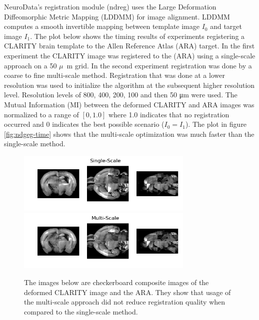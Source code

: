 \documentclass[simplex.tex]{subfiles}
\begin{document}
NeuroData’s registration module (ndreg) uses the Large Deformation
Diffeomorphic Metric Mapping (LDDMM) for image alignment.  LDDMM
computes a smooth invertible mapping between template image $I_0$ and
target image $I_1$. The plot below shows the timing results of experiments
registering a CLARITY brain template to the Allen Reference Atlas (ARA)
target.  In the first experiment the CLARITY image was registered to the
(ARA) using a single-scale approach on a 50 $\mu$~m grid.  In the second
experiment registration was done by a coarse to fine multi-scale method.
Registration that was done at a lower resolution was used to initialize
the algorithm at the subsequent higher resolution level.  Resolution
levels of 800, 400, 200, 100 and then 50 μm were used. The Mutual
Information (MI) between the deformed CLARITY and ARA images was
normalized to a range of $[0, 1.0]$ where 1.0 indicates that no
registration occurred and 0 indicates the best possible scenario ($I_0 =
I_1$).  The plot in figure \ref{fig:ndgeg-time} shows that the multi-scale optimization was much faster
than the single-scale method.


\begin{figure}[h!]
\begin{cframed}
\centering
\includegraphics[width=0.75\textwidth]{./figs/ndreg-single.png}
\includegraphics[width=0.75\textwidth]{./figs/ndreg-multiscale.png}
\label{fig:ndreg-scale}
\caption{
  The images below are checkerboard composite images of the deformed
  CLARITY image and the ARA.  They show that usage of the multi-scale
  approach did not reduce registration quality when compared to the
  single-scale method.
}
\end{cframed}
\end{figure}
\end{document}
